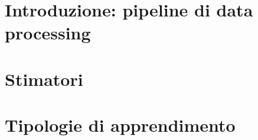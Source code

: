 \documentclass[italian, disablemarginnotes, allowcoloredmath]{../../../Resources/Utils/ClassNotes}
\begin{document}

\section{Introduzione: pipeline di data processing}


\section{Stimatori}


\section{Tipologie di apprendimento}


% 
\end{document}
